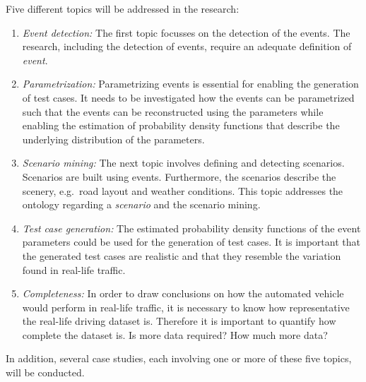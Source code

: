 \documentclass[10pt,final,a4paper,oneside,onecolumn]{article}
\begin{document}
Five different topics will be addressed in the research:
\begin{enumerate}
	\item \emph{Event detection:}\,\,The first topic focusses on the detection of the events. The research, including the detection of events, require an adequate definition of \emph{event}.
	\item \emph{Parametrization:}\,\,Parametrizing events is essential for enabling the generation of test cases. It needs to be investigated how the events can be parametrized such that the events can be reconstructed using the parameters while enabling the estimation of probability density functions that describe the underlying distribution of the parameters.
	\item \emph{Scenario mining:}\,\,The next topic involves defining and detecting scenarios. Scenarios are built using events. Furthermore, the scenarios describe the scenery, e.g.\ road layout and weather conditions. This topic addresses the ontology regarding a \emph{scenario} and the scenario mining.
	\item \emph{Test case generation:}\,\,The estimated probability density functions of the event parameters could be used for the generation of test cases. It is important that the generated test cases are realistic and that they resemble the variation found in real-life traffic.
	\item \emph{Completeness:}\,\,In order to draw conclusions on how the automated vehicle would perform in real-life traffic, it is necessary to know how representative the real-life driving dataset is. Therefore it is important to quantify how complete the dataset is. Is more data required? How much more data?
\end{enumerate}

In addition, several case studies, each involving one or more of these five topics, will be conducted.
\end{document}
